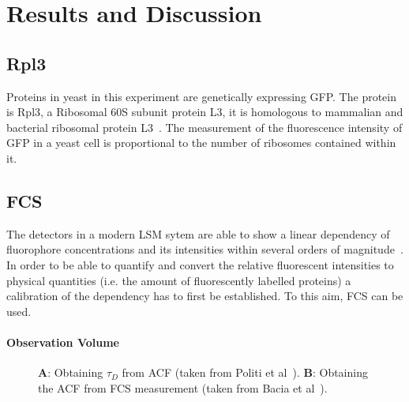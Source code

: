 \section{Results and Discussion}

\subsection{Rpl3}
Proteins in yeast in this experiment are genetically expressing GFP. 
The protein is Rpl3, a Ribosomal 60S subunit protein L3, it is homologous to mammalian and bacterial ribosomal protein L3~\cite{YeaGenRpl3}. 
The measurement of the fluorescence intensity of GFP in a yeast cell is proportional to the number of ribosomes contained within it.

\subsection{FCS}
The detectors in a modern LSM sytem are able to show a linear dependency of fluorophore concentrations and its intensities within several orders of magnitude~\cite{Politi2018}. 
In order to be able to quantify and convert the relative fluorescent intensities to physical quantities (i.e. the amount of fluorescently labelled proteins) a calibration of the dependency has to first be established. 
To this aim, FCS can be used.

\paragraph{Observation Volume} 
\begin{figure}[h!]
\centering
{}\hfil
{}
\caption{\textbf{A}: Obtaining $\tau_{D}$ from ACF (taken from Politi et al~\cite{Politi2018}). \textbf{B}: Obtaining the ACF from FCS measurement (taken from Bacia et al~\cite{Bacia2006}).}
\label{fig:acf-fcs}
\end{figure}

